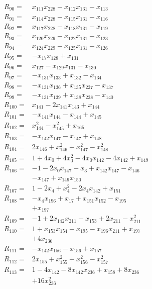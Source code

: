 \begin{align*}
R_{90}={}&x_{111}x_{228} -x_{112}x_{131} -x_{113}\\[3pt]
R_{91}={}&x_{114}x_{228} -x_{115}x_{131} -x_{116}\\[3pt]
R_{92}={}&x_{117}x_{228} -x_{118}x_{131} -x_{119}\\[3pt]
R_{93}={}&x_{120}x_{229} -x_{122}x_{131} -x_{123}\\[3pt]
R_{94}={}&x_{124}x_{229} -x_{125}x_{131} -x_{126}\\[3pt]
R_{95}={}&-x_{17}x_{128} +x_{131}\\[3pt]
R_{96}={}&x_{127} -x_{129}x_{131} -x_{130}\\[3pt]
R_{97}={}&-x_{131}x_{133} +x_{132} -x_{134}\\[3pt]
R_{98}={}&-x_{131}x_{136} +x_{135}x_{227} -x_{137}\\[3pt]
R_{99}={}&-x_{131}x_{139} +x_{138}x_{228} -x_{140}\\[3pt]
R_{100}={}&x_{141} -2x_{141}x_{143} +x_{144}\\[3pt]
R_{101}={}&-x_{141}x_{144} -x_{144} +x_{145}\\[3pt]
R_{102}={}&x_{144}^{2} -x_{145}^{2} +x_{165}\\[3pt]
R_{103}={}&-x_{142}x_{147} -x_{147} +x_{148}\\[3pt]
R_{104}={}&2x_{146} +x_{146}^{2} +x_{147}^{2} -x_{148}^{2}\\[3pt]
R_{105}={}&1 +4x_{0} +4x_{0}^{2} -4x_{0}x_{142} -4x_{142} +x_{149}\\[3pt]
R_{106}={}&-1 -2x_{0}x_{147} +x_{3} +x_{142}x_{147} -x_{146}\\
&-x_{147} +x_{149}x_{150}\\[3pt]
R_{107}={}&1 -2x_{4} +x_{4}^{2} -2x_{4}x_{142} +x_{151}\\[3pt]
R_{108}={}&-x_{4}x_{196} +x_{17} +x_{151}x_{152} -x_{195}\\
&+x_{197}\\[3pt]
R_{109}={}&-1 +2x_{142}x_{211} -x_{153} +2x_{211} -x_{211}^{2}\\[3pt]
R_{110}={}&1 +x_{153}x_{154} -x_{195} -x_{196}x_{211} +x_{197}\\
&+4x_{236}\\[3pt]
R_{111}={}&-x_{142}x_{156} -x_{156} +x_{157}\\[3pt]
R_{112}={}&2x_{155} +x_{155}^{2} +x_{156}^{2} -x_{157}^{2}\\[3pt]
R_{113}={}&1 -4x_{142} -8x_{142}x_{236} +x_{158} +8x_{236}\\
&+16x_{236}^{2}\\[3pt]

\end{align*}
